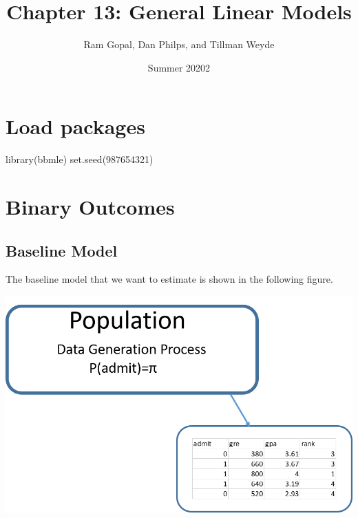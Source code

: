\documentclass[
]{article}
\title{Chapter 13: General Linear Models}
\author{Ram Gopal, Dan Philps, and Tillman Weyde}
\date{Summer 20202}
\newenvironment{Shaded}{\begin{snugshade}}{\end{snugshade}}
\newcommand{\DecValTok}[1]{\textcolor[rgb]{0.00,0.00,0.81}{#1}}
\newcommand{\FunctionTok}[1]{\textcolor[rgb]{0.00,0.00,0.00}{#1}}
\newcommand{\NormalTok}[1]{#1}
\begin{document}
\maketitle

{
\setcounter{tocdepth}{4}
\tableofcontents
}
\hypertarget{load-packages}{%
\section{Load packages}\label{load-packages}}

\begin{Shaded}
\begin{Highlighting}[]
\FunctionTok{library}\NormalTok{(bbmle)}
\FunctionTok{set.seed}\NormalTok{(}\DecValTok{987654321}\NormalTok{)}
\end{Highlighting}
\end{Shaded}

\hypertarget{binary-outcomes}{%
\section{Binary Outcomes}\label{binary-outcomes}}

\hypertarget{baseline-model}{%
\subsection{Baseline Model}\label{baseline-model}}

The baseline model that we want to estimate is shown in the following
figure.

\includegraphics{estpic11.png}
\end{document}
